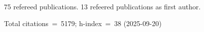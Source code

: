 75 refereed publications. 13 refeered publications as first author.

Total citations~=~5179; h-index~=~38 (2025-09-20)